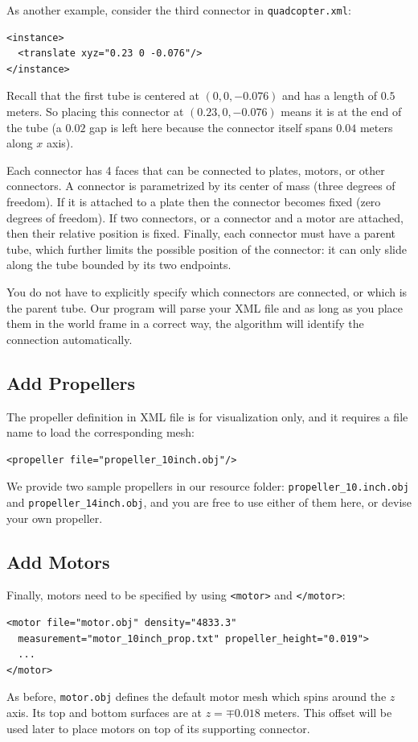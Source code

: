 As another example, consider the third connector in \texttt{quadcopter.xml}:
\begin{verbatim}
<instance>
  <translate xyz="0.23 0 -0.076"/>
</instance>
\end{verbatim}
Recall that the first tube is centered at $(0,0,-0.076)$ and has a length of $0.5$ meters. So placing this connector at $(0.23,0,-0.076)$ means it is at the end of the tube (a $0.02$ gap is left here because the connector itself spans $0.04$ meters along $x$ axis).

Each connector has 4 faces that can be connected to plates, motors, or other connectors. A connector is parametrized by its center of mass (three degrees of freedom). If it is attached to a plate then the connector becomes fixed (zero degrees of freedom). If two connectors, or a connector and a motor are attached, then their relative position is fixed. Finally, each connector must have a parent tube, which further limits the possible position of the connector: it can only slide along the tube bounded by its two endpoints.

You do not have to explicitly specify which connectors are connected, or which is the parent tube. Our program will parse your XML file and as long as you place them in the world frame in a correct way, the algorithm will identify the connection automatically.

\subsection{Add Propellers}
The propeller definition in XML file is for visualization only, and it requires a file name to load the corresponding mesh:
\begin{verbatim}
<propeller file="propeller_10inch.obj"/>
\end{verbatim}
We provide two sample propellers in our resource folder: \texttt{propeller\_10.inch.obj} and \texttt{propeller\_14inch.obj}, and you are free to use either of them here, or devise your own propeller.

\subsection{Add Motors}
Finally, motors need to be specified by using \texttt{<motor>} and \texttt{</motor>}:
\begin{verbatim}
<motor file="motor.obj" density="4833.3"
  measurement="motor_10inch_prop.txt" propeller_height="0.019">
  ...
</motor>
\end{verbatim}
As before, \texttt{motor.obj} defines the default motor mesh which spins around the $z$ axis. Its top and bottom surfaces are at $z=\mp0.018$ meters. This offset will be used later to place motors on top of its supporting connector.

